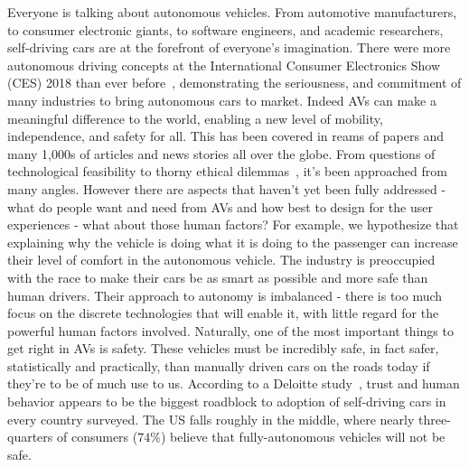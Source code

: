 Everyone is talking about autonomous vehicles. 
From automotive manufacturers, to consumer electronic giants, to software engineers, and academic researchers, self-driving cars are at the forefront of everyone’s imagination. 
There were more autonomous driving concepts at the International Consumer Electronics Show (CES) 2018 than ever before~\cite{techcrunch_2018}, demonstrating the seriousness, and commitment of many industries to bring autonomous cars to market.
Indeed AVs can make a meaningful difference to the world, enabling a new level of mobility, independence, and safety for all. 
This has been covered in reams of papers and many 1,000s of articles and news stories all over the globe. 
From questions of technological feasibility to thorny ethical dilemmas~\cite{lin2016ethics}, it’s been approached from many angles.
However there are aspects that haven’t yet been fully addressed - what do people want and need from AVs and how best to design for the user experiences - what about those human factors?
For example, we hypothesize that explaining why the vehicle is doing what it is doing to the passenger can increase their level of comfort in the autonomous vehicle.
The industry is preoccupied with the race to make their cars be as smart as possible and more safe than human drivers.
Their approach to autonomy is imbalanced - there is too much focus on the discrete technologies that will enable it, with little regard for the powerful human factors involved. 
Naturally, one of the most important things to get right in AVs is safety. 
These vehicles must be incredibly safe, in fact safer, statistically and practically, than manually driven cars on the roads today if they’re to be of much use to us. 
According to a Deloitte study~\cite{deloitte}, trust and human behavior appears to be the biggest roadblock to adoption of self-driving cars in every country surveyed. 
The US falls roughly in the middle, where nearly three-quarters of consumers ($74\%$) believe that fully-autonomous vehicles will not be safe. 


